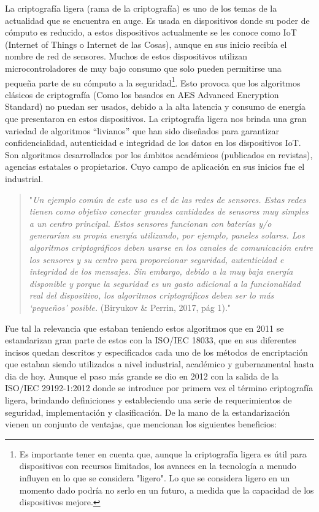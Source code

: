 \documentclass[]{article}
\begin{document}
La criptografía ligera (rama de la criptografía) es uno de los temas de la actualidad que se encuentra en auge. Es usada en dispositivos donde su poder de cómputo es reducido, a estos dispositivos actualmente se les conoce como IoT (Internet of Things o Internet de las Cosas), aunque en sus inicio recibía el nombre de red de sensores. Muchos de estos dispositivos utilizan microcontroladores de muy bajo consumo que solo pueden permitirse una pequeña parte de su cómputo a la seguridad\footnote{Es importante tener en cuenta que, aunque la criptografía ligera es útil para dispositivos con recursos limitados, los avances en la tecnología a menudo influyen en lo que se considera "ligero". Lo que se considera ligero en un momento dado podría no serlo en un futuro, a medida que la capacidad de los dispositivos mejore.}. Esto provoca que los algoritmos clásicos de criptografía (Como los basados en AES Advanced Encryption Standard) no puedan ser usados, debido a la alta latencia y consumo de energía que presentaron en estos dispositivos. La criptografía ligera nos brinda una gran variedad de algoritmos “livianos” que han sido diseñados para garantizar confidencialidad, autenticidad e integridad de los datos en los dispositivos IoT. Son algoritmos desarrollados por los ámbitos académicos (publicados en revistas), agencias estatales o propietarios. Cuyo campo de aplicación en sus inicios fue el industrial.
\begin{quote}
	"\textit{Un ejemplo común de este uso es el de las redes de sensores. Estas redes tienen como objetivo conectar grandes cantidades de sensores muy simples a un centro principal. Estos sensores funcionan con baterías y/o generarían su propia energía utilizando, por ejemplo, paneles solares. Los algoritmos criptográficos deben usarse en los canales de comunicación entre los sensores y su centro para proporcionar seguridad, autenticidad e integridad de los mensajes. Sin embargo, debido a la muy baja energía disponible y porque la seguridad es un gasto adicional a la funcionalidad real del dispositivo, los algoritmos criptográficos deben ser lo más ‘pequeños’ posible.} (Biryukov \& Perrin, 2017, pág 1)."
\end{quote}
Fue tal la relevancia que estaban teniendo estos algoritmos que en 2011 se estandarizan gran parte de estos con la ISO/IEC 18033, que en sus diferentes incisos quedan descritos y especificados cada uno de los métodos de encriptación que estaban siendo utilizados a nivel industrial, académico y gubernamental hasta dia de hoy. Aunque el paso más grande se dio en 2012 con la salida de la ISO/IEC 29192-1:2012 donde se introduce por primera vez el término criptografía ligera, brindando definiciones y estableciendo una serie de requerimientos de seguridad, implementación y clasificación. De la mano de la estandarización vienen un conjunto de ventajas, que \cite{eterovic15stream} mencionan los siguientes beneficios:
\end{document}

